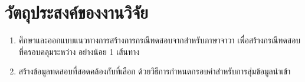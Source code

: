 \section{วัตถุประสงค์ของงานวิจัย}

\begin{enumerate}
    \item ศึกษาและออกแบบแนวทางการสร้างการกรณีทดสอบจาก{\scg}สำหรับภาษาจาวา เพื่อสร้างกรณีทดสอบที่ครอบคลุม{\TestPath}ระหว่าง{\CUT} อย่างน้อย 1 เส้นทาง
    \item สร้างข้อมูลทดสอบที่สอดคล้องกับ{\TestPath}ที่เลือก ด้วยวิธีการกำหนดกรอบค่าสำหรับการสุ่มข้อมูลนำเข้า
\end{enumerate}

